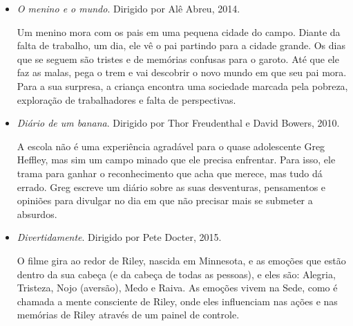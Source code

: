 \documentclass[11pt]{extarticle}
\begin{document}
\begin{itemize}
\item \textit{O menino e o mundo}. Dirigido por Alê Abreu, 2014.

Um menino mora com os pais em uma pequena cidade do campo. Diante da falta de trabalho, um dia, ele vê o pai partindo para a cidade grande. Os dias que se seguem são tristes e de memórias confusas para o garoto. Até que ele faz as malas, pega o trem e vai descobrir o novo mundo em que seu pai mora. Para a sua surpresa, a criança encontra uma sociedade marcada pela pobreza, exploração de trabalhadores e falta de perspectivas.

\item \textit{Diário de um banana}. Dirigido por Thor Freudenthal e David Bowers, 2010. 

A escola não é uma experiência agradável para o quase adolescente Greg Heffley, mas sim um campo minado que ele precisa enfrentar. Para isso, ele trama para ganhar o reconhecimento que acha que merece, mas tudo dá errado. Greg escreve um diário sobre as suas desventuras, pensamentos e opiniões para divulgar no dia em que não precisar mais se submeter a absurdos.

\item \textit{Divertidamente}. Dirigido por Pete Docter, 2015.

O filme gira ao redor de Riley, nascida em Minnesota, e as emoções que estão dentro da sua cabeça (e da cabeça de todas as pessoas), e eles são: Alegria, Tristeza, Nojo (aversão), Medo e Raiva. As emoções vivem na Sede, como é chamada a mente consciente de Riley, onde eles influenciam nas ações e nas memórias de Riley através de um painel de controle.

\end{itemize}
\end{document}
